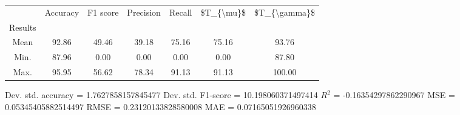 \begin{tabular}{|c|c|c|c|c|c|c|}
\toprule
{} &  Accuracy &  F1 score &  Precision &  Recall &  \$T\_\{\textbackslash mu\}\$ &  \$T\_\{\textbackslash gamma\}\$ \\
Results &           &           &            &         &            &               \\
\hline
Mean    &     92.86 &     49.46 &      39.18 &   75.16 &      75.16 &         93.76 \\
Min.    &     87.96 &      0.00 &       0.00 &    0.00 &       0.00 &         87.80 \\
Max.    &     95.95 &     56.62 &      78.34 &   91.13 &      91.13 &        100.00 \\
\bottomrule
\end{tabular}

 Dev. std. accuracy = 1.7627858157845477
 Dev. std. F1-score = 10.198060371497414
 $R^2$ = -0.16354297862290967
 MSE = 0.05345405882514497
 RMSE = 0.23120133828580008
 MAE = 0.07165051926960338
